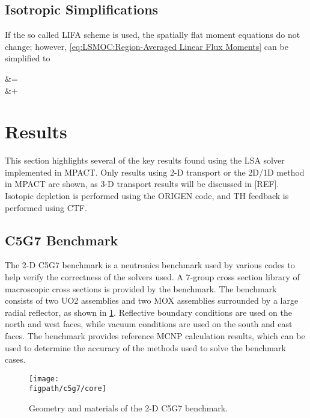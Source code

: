 {{    \subsection{Isotropic Simplifications}{\label{ssec:LSMOC:Isotropic Simplifications}
      If the so called \acf{LIFA} scheme is used, the spatially flat moment equations do not change; however, \cref{eq:LSMOC:Region-Averaged Linear Flux Moments} can be simplified to
      \begin{aequation}\label{eq:LSMOC:LIFA:Region-Averaged Linear Flux Moments}
        \MOCIntegral{\SH\loc\aflux[][g][]} &= \M\frac{\srcL}{\xst}\\ &+ \suml[m]\wt\suml[k]\tA\left[\locIn\dflux+\dirm\segl\left(\frac{\dflux}{\segopt}-\afluxout+\frac{\tsrcF}{\xst}\right)\right]
      \end{aequation}
    }
  }

  \section{Results}{\label{sec:LSMOC:Results}
    This section highlights several of the key results found using the \ac{LSA} solver implemented in MPACT.
    Only results using 2-D transport or the 2D/1D method in MPACT are shown, as 3-D transport results will be discussed in [REF].
    Isotopic depletion is performed using the ORIGEN code, and \ac{TH} feedback is performed using \ac{CTF}.

    \subsection{C5G7 Benchmark}{\label{ssec:LSMOC:C5G7 Benchmark}
      The 2-D C5G7 benchmark \cite{Smith2006} is a neutronics benchmark used by various codes to help verify the correctness of the solvers used.
      A 7-group cross section library of macroscopic cross sections is provided by the benchmark.
      The benchmark consists of two \ac{UO2} assemblies and two \ac{MOX} assemblies surrounded by a large radial reflector, as shown in \cref{fig:LSMOC:C5G7:CoreGeom}.
      Reflective boundary conditions are used on the north and west faces, while vacuum conditions are used on the south and east faces.
      The benchmark provides reference MCNP calculation results, which can be used to determine the accuracy of the methods used to solve the benchmark cases.

      \begin{figure}[htbp]
        \centering
        \texttt{[image: \\figpath/c5g7/core]}
        \caption{Geometry and materials of the 2-D C5G7 benchmark. \label{fig:LSMOC:C5G7:CoreGeom}}
      \end{figure}

}}}
